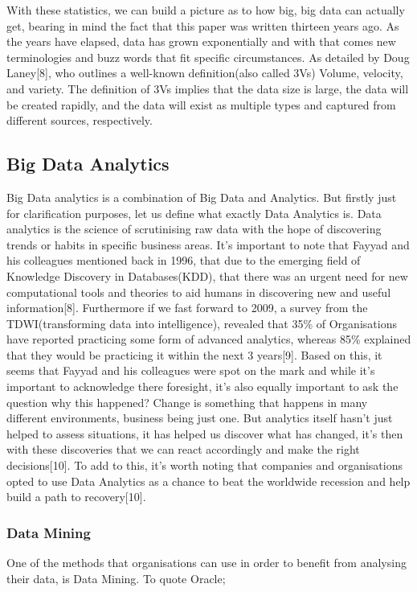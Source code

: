 \documentclass[10pt,journal,compsoc]{IEEEtran}
\begin{document}
With these statistics, we can build a picture as to how big, big data can actually get, bearing in mind the fact that this paper was written thirteen years ago. As the years have elapsed, data has grown exponentially and with that comes new terminologies and buzz words that fit specific circumstances. As detailed by Doug Laney[8], who outlines a well-known definition(also called 3Vs) Volume, velocity, and variety. The definition of 3Vs implies that the data size is large, the data will be created rapidly, and the data will exist as multiple types and captured from different sources, respectively.

\subsection{Big Data Analytics}
Big Data analytics is a combination of Big Data and Analytics. But firstly just for clarification purposes, let us define what exactly Data Analytics is. Data analytics is the science of scrutinising raw data with the hope of discovering trends or habits in specific business areas. It's important to note that Fayyad and his colleagues mentioned back in 1996, that due to the emerging field of Knowledge Discovery in Databases(KDD), that there was an urgent need for new computational tools and theories to aid humans in discovering new and useful information[8]. Furthermore if we fast forward to 2009, a survey from the TDWI(transforming data into intelligence), revealed that 35\% of Organisations have reported practicing some form of advanced analytics, whereas 85\% explained that they would be practicing it within the next 3 years[9]. Based on this, it seems that Fayyad and his colleagues were spot on the mark and while it's important to acknowledge there foresight, it's also equally important to ask the question why this happened? Change is something that happens in many different environments, business being just one. But analytics itself hasn't just helped to assess situations, it has helped us discover what has changed, it's then with these discoveries that we can react accordingly and make the right decisions[10]. To add to this, it's worth noting that companies and organisations opted to use Data Analytics as a chance to beat the worldwide recession and help build a path to recovery[10].

\subsubsection{Data Mining} 
One of the methods that organisations can use in order to benefit from analysing their data, is Data Mining. To quote Oracle;
\end{document}
